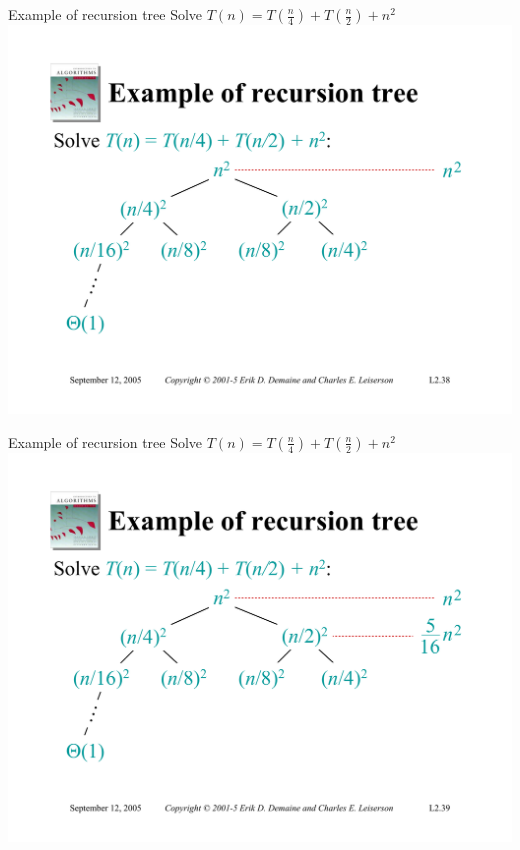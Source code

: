 \documentclass{beamer}
\begin{document}
\begin{frame}{Example of recursion tree}
    Solve $T(n) = T\left(\frac{n}{4}\right) + T\left(\frac{n}{2}\right) + n^2$
    \includegraphics[width=\textwidth, trim={1.10cm 1.20cm 0.30cm 5.75cm}, clip]{pages/lec2_38}
\end{frame}
\begin{frame}{Example of recursion tree}
    Solve $T(n) = T\left(\frac{n}{4}\right) + T\left(\frac{n}{2}\right) + n^2$
    \includegraphics[width=\textwidth, trim={1.10cm 1.20cm 0.30cm 5.75cm}, clip]{pages/lec2_39}
\end{frame}
\end{document}
